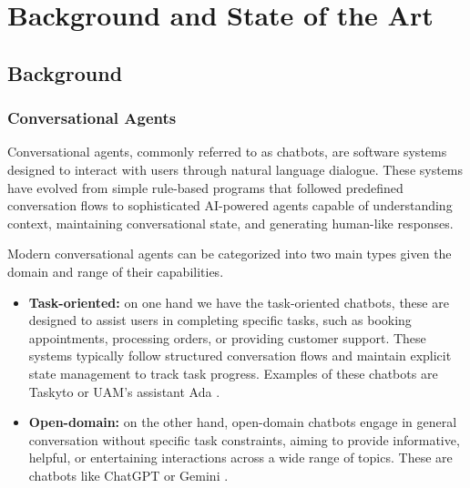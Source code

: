
\chapter{Background and State of the Art}\label{chapter:state_of_the_art}


\section{Background}

\subsection{Conversational Agents}

Conversational agents, commonly referred to as chatbots,
are software systems designed to interact with users through natural language dialogue.
These systems have evolved from simple rule-based programs that followed predefined conversation flows
to sophisticated AI-powered agents capable of understanding context, maintaining conversational state, and generating human-like responses.

Modern conversational agents can be categorized into two main types
given the domain and range of their capabilities.
\begin{itemize}
  \item \textbf{Task-oriented:} on one hand we have the task-oriented chatbots,
  these are designed to assist users in completing specific tasks, such as booking appointments, processing orders, or providing customer support.
  These systems typically follow structured conversation flows
and maintain explicit state management to track task progress.
  Examples of these chatbots are Taskyto \autocite{sanchezcuadradoAutomatingDevelopmentTaskoriented2024} or UAM's assistant Ada \autocite{AdaUAM}.

  \item \textbf{Open-domain:}
  on the other hand, open-domain chatbots
  engage in general conversation without specific task constraints,
  aiming to provide informative, helpful, or entertaining interactions across a wide range of topics.
  These are chatbots like ChatGPT \autocite{ChatGPT} or Gemini \autocite{GoogleGemini}.
\end{itemize}

